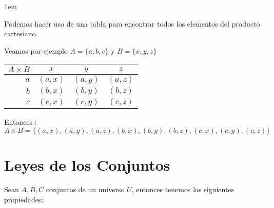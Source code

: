 \documentclass[12pt, fleqn]{report}                             %
\newenvironment{SmallIndentation}[1][0.75em]                    %
        {\begin{adjustwidth}{#1}{}\begin{footnotesize}}             %
        {\end{footnotesize}\end{adjustwidth}}                       %
\theoremstyle{break}                                            %
\begin{document}
                \begin{SmallIndentation}[1em]
                    
                    Podemos hacer uso de una tabla para encontrar todos los elementos del producto
                    cartesiano.

                    Veamos por ejemplo $A = \{a, b, c\}$ y $B = \{ x, y, z\}$

                    \begin{tabular}{r ||c |c | c  }
                       $A \times B$ & $x$ & $y$ & $z$ \\
                       \midrule
                      
                       $a$ &  $(a, x)$  &  $(a, y)$  &  $(a, z)$  \\
                       $b$ &  $(b, x)$  &  $(b, y)$  &  $(b, z)$  \\
                       $c$ &  $(c, x)$  &  $(c, y)$  &  $(c, z)$  \\
                     
                    \end{tabular}

                    Entonces : 
                    \begin{equation*}
                        A \times B = 
                        \{
                            (a, x) , (a, y) , (a, z) ,
                            (b, x) , (b, y) , (b, z) ,
                            (c, x) , (c, y) , (c, z) 
                        \}
                    \end{equation*}

                \end{SmallIndentation}
                    


        \clearpage
        \section{Leyes de los Conjuntos}
                
            Sean $A, B, C$ conjuntos de un universo $U$, entonces tenemos las siguientes propiedades:
\end{document}
